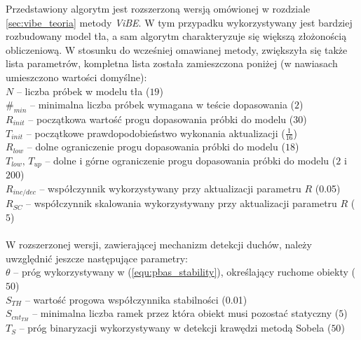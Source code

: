 Przedstawiony algorytm jest rozszerzoną wersją omówionej w rozdziale \ref{sec:vibe_teoria} metody \textit{ViBE}. W tym przypadku wykorzystywany jest bardziej rozbudowany model tła, a sam algorytm charakteryzuje się większą złożonością obliczeniową. W stosunku do wcześniej omawianej metody, zwiększyła się także lista parametrów, kompletna lista została zamieszczona poniżej (w nawiasach umieszczono wartości domyślne):\\
\-\hspace{1cm} $N$ -- liczba próbek w modelu tła ($19$)\\
\-\hspace{1cm} $\#_{min}$ -- minimalna liczba próbek wymagana w teście dopasowania ($2$)\\
\-\hspace{1cm} $R_{init}$ -- początkowa wartość progu dopasowania próbki do modelu ($30$) \\
\-\hspace{1cm} $T_{init}$ -- początkowe prawdopodobieństwo wykonania aktualizacji ($\frac{1}{16}$)\\
\-\hspace{1cm} $R_{low}$ -- dolne ograniczenie progu dopasowania próbki do modelu ($18$) \\
\-\hspace{1cm} $T_{low}, \, T_{up} $ -- dolne i górne ograniczenie progu dopasowania próbki do modelu ($2$ i $200$) \\
\-\hspace{1cm} $R_{inc/dec}$ -- współczynnik wykorzystywany przy aktualizacji parametru $R$ (\num{0.05}) \\
\-\hspace{1cm} $R_{SC}$ -- współczynnik skalowania wykorzystywany przy aktualizacji parametru $R$ ($5$)\\
\\
\noindent W rozszerzonej wersji, zawierającej mechanizm detekcji duchów, należy uwzględnić jeszcze następujące parametry:\\
\-\hspace{1cm} $\theta$ -- próg wykorzystywany w (\ref{equ:pbas_stability}), określający ruchome obiekty ($50$)\\
\-\hspace{1cm} $S_{TH}$ -- wartość progowa współczynnika stabilności (\num{0.01})\\
\-\hspace{1cm} $S_{cnt_{TH}}$ -- minimalna liczba ramek przez która obiekt musi pozostać statyczny ($5$) \\
\-\hspace{1cm} $T_{S}$ -- próg binaryzacji wykorzystywany w detekcji krawędzi metodą Sobela ($50$)\\

